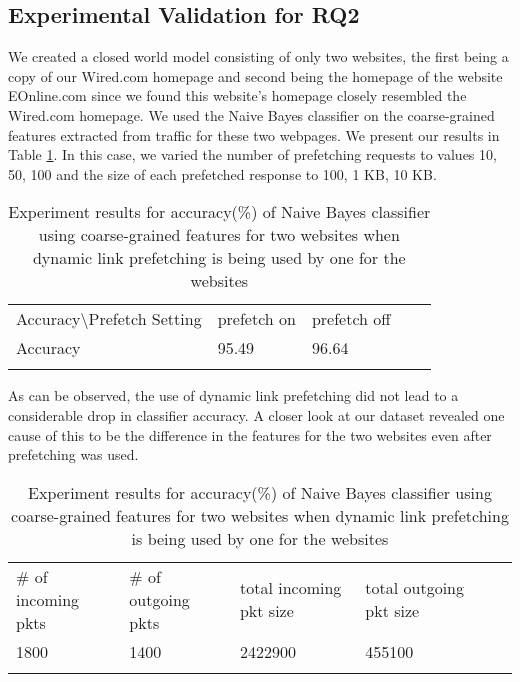 \subsection{Experimental Validation for RQ2}
We created a closed world model consisting of only two websites, the first being a copy of our Wired.com homepage\cite{tj-wired} and second being the homepage of the website EOnline.com\cite{eonline} since we found this website's homepage closely resembled the Wired.com homepage. 
We used the Naive Bayes classifier on the coarse-grained features extracted from traffic for these two webpages. 
We present our results in Table \ref{table:rq2-nb}. 
In this case, we varied the number of prefetching requests to values 10, 50, 100 and the size of each prefetched response to 100, 1 KB, 10 KB. 

\begin{table}[]
\centering
\caption{Experiment results for accuracy(\%) of Naive Bayes classifier using coarse-grained features for two websites when dynamic link prefetching is being used by one for the websites}
\label{table:rq2-nb}
\begin{tabular}{lllll}
\cline{1-3}
\multicolumn{1}{|l|}{Accuracy\textbackslash Prefetch Setting} & \multicolumn{1}{l|}{prefetch on} & \multicolumn{1}{l|}{prefetch off} &  &  \\ \cline{1-3}
\multicolumn{1}{|l|}{Accuracy}                    & \multicolumn{1}{l|}{95.49}         & \multicolumn{1}{l|}{96.64}          &  &  \\ \cline{1-3}
                                                     &                                  &                                   &  & 
\end{tabular}                  
\end{table}

As can be observed, the use of dynamic link prefetching did not lead to a considerable drop in classifier accuracy. 
A closer look at our dataset revealed one cause of this to be the difference in the features for the two websites even after prefetching was used. 

\begin{table}[]
\centering
\caption{Experiment results for accuracy(\%) of Naive Bayes classifier using coarse-grained features for two websites when dynamic link prefetching is being used by one for the websites}
\label{table:rq2-diff}
\begin{tabular}{llllll}
\cline{1-4}
\multicolumn{1}{|l|}{\# of incoming pkts} & \multicolumn{1}{l|}{\# of outgoing pkts} & \multicolumn{1}{l|}{total incoming pkt size} & \multicolumn{1}{l|}{total outgoing pkt size} &  &  \\ \cline{1-4}
\multicolumn{1}{|l|}{1800}         & \multicolumn{1}{l|}{1400}  & \multicolumn{1}{l|}{2422900}  & \multicolumn{1}{l|}{455100}      &  &  \\ \cline{1-4}
                                          &              &                                  &                                   &  & 
\end{tabular}                  
\end{table}



